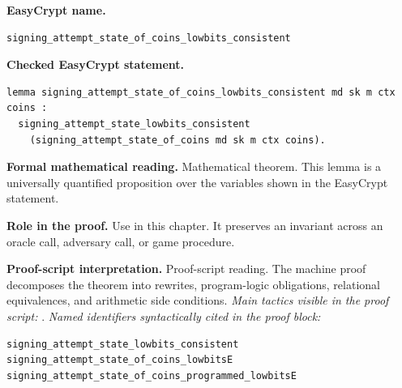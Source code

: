 \begin{formaltheorem}
\noindent\textbf{EasyCrypt name.}
\begin{lstlisting}[language=EasyCrypt,basicstyle=\ttfamily\scriptsize]
signing_attempt_state_of_coins_lowbits_consistent
\end{lstlisting}
\noindent\textbf{Checked EasyCrypt statement.}
\begin{lstlisting}[language=EasyCrypt,basicstyle=\ttfamily\scriptsize]
lemma signing_attempt_state_of_coins_lowbits_consistent md sk m ctx coins :
  signing_attempt_state_lowbits_consistent
    (signing_attempt_state_of_coins md sk m ctx coins).
\end{lstlisting}
\noindent\textbf{Formal mathematical reading.}
Mathematical theorem. This lemma is a universally quantified proposition over the variables shown in the EasyCrypt statement.

\noindent\textbf{Role in the proof.}
Use in this chapter. It preserves an invariant across an oracle call, adversary call, or game procedure.

\noindent\textbf{Proof-script interpretation.}
Proof-script reading. The machine proof decomposes the theorem into rewrites, program-logic obligations, relational equivalences, and arithmetic side conditions.
\emph{Main tactics visible in the proof script:} .
\emph{Named identifiers syntactically cited in the proof block:}
\begin{lstlisting}[language=EasyCrypt,basicstyle=\ttfamily\scriptsize]
signing_attempt_state_lowbits_consistent
signing_attempt_state_of_coins_lowbitsE
signing_attempt_state_of_coins_programmed_lowbitsE
\end{lstlisting}

\end{formaltheorem}

